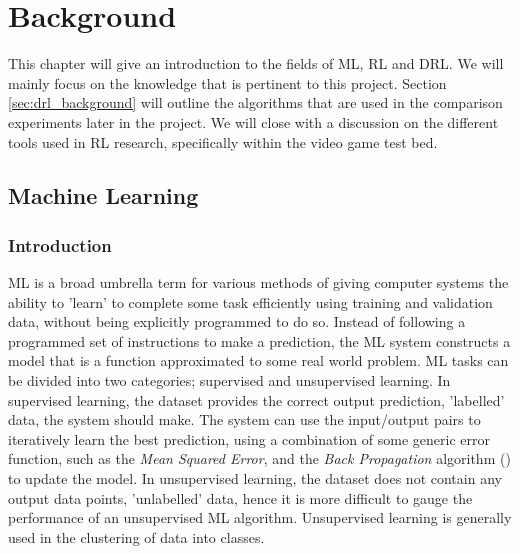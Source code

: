 \chapter{Background} \label{ch:background}
This chapter will give an introduction to the fields of ML, RL and DRL. We will mainly focus on the knowledge that is pertinent to this project. Section \ref{sec:drl_background} will outline the algorithms that are used in the comparison experiments later in the project. We will close with a discussion on the different tools used in RL research, specifically within the video game test bed.

\section{Machine Learning}
\subsection{Introduction}
ML is a broad umbrella term for various methods of giving computer systems the ability to 'learn' to
complete some task efficiently using training and validation data, without being explicitly
programmed to do so. Instead of following a programmed set of instructions to make a prediction, the
ML system constructs a model that is a function approximated to some real world problem. ML tasks
can be divided into two categories; supervised and unsupervised learning. In supervised learning,
the dataset provides the correct output prediction, 'labelled' data, the system should make. The
system can use the input/output pairs to iteratively learn the best prediction, using a combination
of some generic error function, such as the \textit{Mean Squared Error}, and the \textit{Back Propagation} algorithm (\citet{chauvin-bp}) to update the model. In unsupervised learning, the dataset
does not contain any output data points, 'unlabelled' data, hence it is more difficult to gauge the
performance of an unsupervised ML algorithm. Unsupervised learning is generally used in the
clustering of data into classes. \paragraph{}

